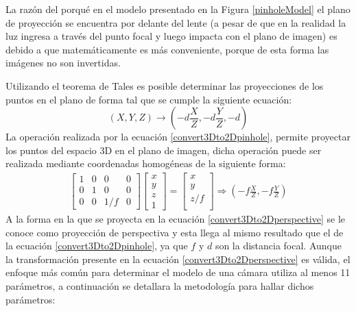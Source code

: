 La razón del porqué en el modelo presentado en la Figura \ref{pinholeModel} el plano de proyección se encuentra por delante del lente (a pesar de que en la realidad la luz ingresa a través del punto focal y luego impacta con el plano de imagen) es debido a que matemáticamente es más conveniente, porque de esta forma las imágenes no son invertidas.

Utilizando el teorema de Tales es posible determinar las proyecciones de los puntos en el plano de forma tal que se cumple la siguiente ecuación:
\begin{equation}
    (X, Y, Z) \longrightarrow (-d\frac{X}{Z}, -d\frac{Y}{Z}, -d)  \label{convert3Dto2Dpinhole}
\end{equation}
La operación realizada por la ecuación \eqref{convert3Dto2Dpinhole}, permite proyectar los puntos del espacio 3D en el plano de imagen, dicha operación puede ser realizada mediante coordenadas homogéneas de la siguiente forma:
\begin{align}
            \begin{bmatrix}
            1 & 0 & 0 & 0\\
            0 & 1 & 0 & 0\\
            0 & 0 & 1/f & 0
            \end{bmatrix}
            \begin{bmatrix}
            x\\
            y\\
            z\\
            1
            \end{bmatrix}
            =
            \begin{bmatrix}
            x\\
            y\\
            z/f\\
            \end{bmatrix} \Rightarrow \left(-f\frac{X}{Z}, -f\frac{Y}{Z}\right)\label{convert3Dto2Dperspective}
\end{align}
A la forma en la que se proyecta en la ecuación \eqref{convert3Dto2Dperspective} se le conoce como proyección de perspectiva \cite{Szeliski2022} y esta llega al mismo resultado que el de la ecuación \eqref{convert3Dto2Dpinhole}, ya que $f$ y $d$ son la distancia focal. Aunque la transformación presente en la ecuación \eqref{convert3Dto2Dperspective} es válida, el enfoque más común para determinar el modelo de una cámara utiliza al menos 11 parámetros, a continuación se detallara la metodología para hallar dichos parámetros:
